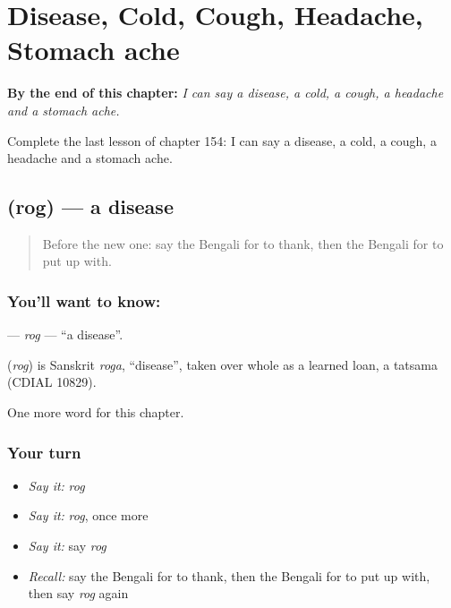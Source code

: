 
\chapter{Disease, Cold, Cough, Headache, Stomach ache}
\label{ch:bn-disease-cold-cough-headache-stomach-ache}

\begin{chapteropening}
\textbf{By the end of this chapter:} \emph{I can say a disease, a cold, a cough, a headache and a stomach ache.}

Complete the last lesson of chapter 154: I can say a disease, a cold, a cough, a headache and a stomach ache.
\end{chapteropening}

\section[\texorpdfstring{\bn{রোগ} (rog)}{রোগ (rog)}]{ (rog) — a disease}

\label{lesson:BN-C154-rog}



\begin{quote}
Before the new one: say the Bengali for to thank, then the Bengali for to put up with.
\end{quote}

\subsection*{You'll want to know: }
\textbf{} — \emph{rog} — \textquotedblleft{}a disease\textquotedblright{}.

\begin{cousinweb}
\textbf{} (\emph{rog}) is Sanskrit \emph{roga}, \textquotedblleft{}disease\textquotedblright{}, taken over whole as a learned loan, a tatsama (CDIAL 10829).
\end{cousinweb}

\begin{grammarlens}[title={What you've built}]
One more word for this chapter.
\end{grammarlens}

\subsection*{Your turn}
\begin{itemize}
\raggedright
  \item \emph{Say it:} \emph{rog}
  \item \emph{Say it:} \emph{rog}, once more
  \item \emph{Say it:} say \emph{rog}
  \item \emph{Recall:} say the Bengali for to thank, then the Bengali for to put up with, then say \emph{rog} again
\end{itemize}

